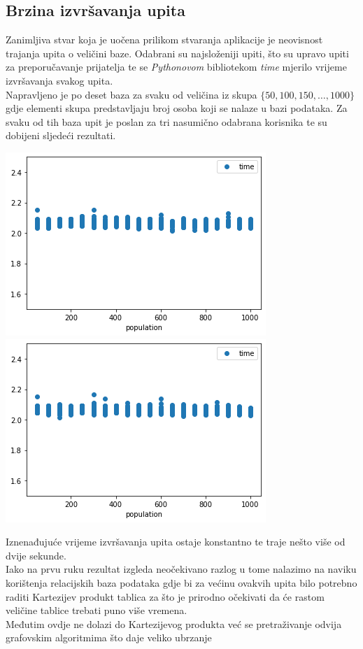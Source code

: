 \documentclass[titlepage, 12pt]{scrartcl}
\begin{document}
	\subsection{Brzina izvršavanja upita}
	Zanimljiva stvar koja je uočena prilikom stvaranja aplikacije je neovisnost trajanja upita o veličini baze. Odabrani su najsloženiji upiti, što su upravo upiti za preporučavanje prijatelja te se \emph{Pythonovom} bibliotekom \emph{time} mjerilo vrijeme izvršavanja svakog upita. \\
	Napravljeno je po deset baza za svaku od veličina iz skupa $\{50, 100, 150, \dots, 1000\}$ gdje elementi skupa predstavljaju broj osoba koji se nalaze u bazi podataka. Za svaku od tih baza upit je poslan za tri nasumično odabrana korisnika te su dobijeni sljedeći rezultati.\\
	
	\begin{center}
		\includegraphics[scale=0.5]{slike/personal_graph.png}
		\includegraphics[scale=0.5]{slike/business_graph.png}
	\end{center}
	
	
	Iznenađujuće vrijeme izvršavanja upita ostaje konstantno te traje nešto više od dvije sekunde. \\
	Iako na prvu ruku rezultat izgleda neočekivano razlog u tome nalazimo na naviku korištenja relacijskih baza podataka gdje bi za većinu ovakvih upita bilo potrebno raditi Kartezijev produkt tablica za što je prirodno očekivati da će rastom veličine tablice trebati puno više vremena. \\
	Međutim ovdje ne dolazi do Kartezijevog produkta već se pretraživanje odvija grafovskim algoritmima što daje veliko ubrzanje 
	
\end{document}

